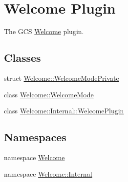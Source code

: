 \hypertarget{group___welcome_plugin}{\section{\-Welcome \-Plugin}
\label{group___welcome_plugin}
}


\-The \-G\-C\-S \hyperlink{namespace_welcome}{\-Welcome} plugin.  


\subsection*{\-Classes}
\begin{DoxyCompactItemize}
\item 
struct \hyperlink{struct_welcome_1_1_welcome_mode_private}{\-Welcome\-::\-Welcome\-Mode\-Private}
\item 
class \hyperlink{class_welcome_1_1_welcome_mode}{\-Welcome\-::\-Welcome\-Mode}
\item 
class \hyperlink{class_welcome_1_1_internal_1_1_welcome_plugin}{\-Welcome\-::\-Internal\-::\-Welcome\-Plugin}
\end{DoxyCompactItemize}
\subsection*{\-Namespaces}
\begin{DoxyCompactItemize}
\item 
namespace \hyperlink{namespace_welcome}{\-Welcome}
\item 
namespace \hyperlink{namespace_welcome_1_1_internal}{\-Welcome\-::\-Internal}
\end{DoxyCompactItemize}
